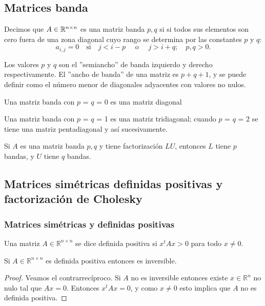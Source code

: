 \subsection{Matrices banda}

Decimos que $A \in\mathbb{R}^{n\times n}$ es una matriz banda $p,q$ si si todos sus elementos
son cero fuera de una zona diagonal cuyo rango se determina por las constantes $p$ y $q$:
$$a_{i,j}=0 \quad \text{si}\quad j<i-p \quad\text{ o }\quad j>i+q; \quad p, q > 0.$$

Los valores $p$ y $q$ son el ''semiancho'' de banda izquierdo y derecho respectivamente. El ''ancho de banda'' de una matriz es $p + q + 1$, y se puede definir como el número menor de diagonales adyacentes con valores no nulos.

Una matriz banda con $p$ = $q$ = 0 es una matriz diagonal

Una matriz banda con $p$ = $q$ = 1 es una matriz tridiagonal; cuando $p$ = $q$ = 2 se tiene una matriz pentadiagonal y así sucesivamente.

\begin{obs}
	Si $A$ es una matriz banda $p,q$ y tiene factorización $LU$, entonces
	$L$ tiene $p$ bandas, y $U$ tiene $q$ bandas.
\end{obs}

\subsection{Matrices simétricas definidas positivas y factorización de Cholesky}

\subsubsection{Matrices simétricas y definidas positivas}

\begin{defi}
Una matriz $A \in \mathbb{R}^{n \times n}$ se dice definida positiva si $x^tAx > 0$ para todo $x \neq 0$.
\end{defi}

\begin{propo}
Si $A \in \mathbb{R}^{n \times n}$ es definida positiva entonces es inversible.

\begin{proof}
Veamos el contrarrecíproco. Si $A$ no es inversible entonces existe $x \in \mathbb{R}^n$ no nulo tal que $Ax = 0$. Entonces $x^t A x = 0$, y como $x \neq 0$ esto implica que $A$ no es definida positiva.
\end{proof}
\end{propo}

